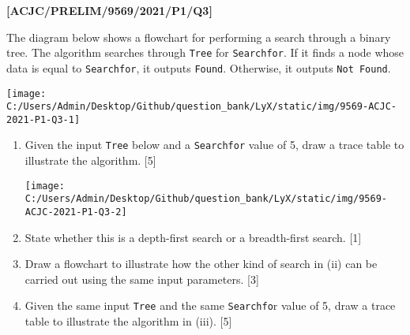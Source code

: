 \item \textbf{{[}ACJC/PRELIM/9569/2021/P1/Q3{]} }

The diagram below shows a flowchart for performing a search through
a binary tree. The algorithm searches through \texttt{Tree} for \texttt{Searchfor}.
If it finds a node whose data is equal to \texttt{Searchfor}, it outputs
\texttt{Found}. Otherwise, it outputs \texttt{Not Found}.
\noindent \begin{center}
\texttt{[image: C:/Users/Admin/Desktop/Github/question\_bank/LyX/static/img/9569-ACJC-2021-P1-Q3-1]}\quad{}
\par\end{center}
\begin{enumerate}
\item Given the input \texttt{Tree} below and a \texttt{Searchfor} value
of 5, draw a trace table to illustrate the algorithm. \hfill{} {[}5{]}
\noindent \begin{center}
\texttt{[image: C:/Users/Admin/Desktop/Github/question\_bank/LyX/static/img/9569-ACJC-2021-P1-Q3-2]}\quad{}
\par\end{center}
\item State whether this is a depth-first search or a breadth-first search.
\hfill{} {[}1{]}
\item Draw a flowchart to illustrate how the other kind of search in (ii)
can be carried out using the same input parameters. \hfill{} {[}3{]}
\item Given the same input \texttt{Tree} and the same \texttt{Searchfo}r
value of 5, draw a trace table to illustrate the algorithm in (iii).
\hfill{} {[}5{]}
\end{enumerate}